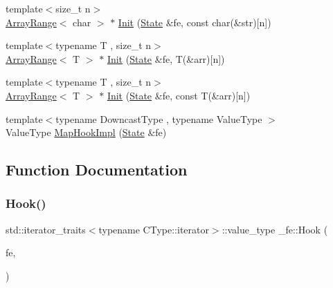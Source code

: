 \begin{DoxyCompactItemize}
\item 
{\footnotesize template$<$size\+\_\+t n$>$ }\\\mbox{\hyperlink{struct__fe_1_1ArrayRange}{Array\+Range}}$<$ char $>$ $\ast$ \mbox{\hyperlink{namespace__fe_ac8a11e0ea804066967b5e731edd79876}{Init}} (\mbox{\hyperlink{struct__fe_1_1State}{State}} \&fe, const char(\&str)\mbox{[}n\mbox{]})
\item 
{\footnotesize template$<$typename T , size\+\_\+t n$>$ }\\\mbox{\hyperlink{struct__fe_1_1ArrayRange}{Array\+Range}}$<$ T $>$ $\ast$ \mbox{\hyperlink{namespace__fe_a0de0f309238a8bd2fd46faec6164f1e7}{Init}} (\mbox{\hyperlink{struct__fe_1_1State}{State}} \&fe, T(\&arr)\mbox{[}n\mbox{]})
\item 
{\footnotesize template$<$typename T , size\+\_\+t n$>$ }\\\mbox{\hyperlink{struct__fe_1_1ArrayRange}{Array\+Range}}$<$ T $>$ $\ast$ \mbox{\hyperlink{namespace__fe_ae66d437a50aae83e14008aa3dc16cd3c}{Init}} (\mbox{\hyperlink{struct__fe_1_1State}{State}} \&fe, const T(\&arr)\mbox{[}n\mbox{]})
\item 
{\footnotesize template$<$typename Downcast\+Type , typename Value\+Type $>$ }\\Value\+Type \mbox{\hyperlink{namespace__fe_ae9577cf6364fac037b3be1e07193940c}{Map\+Hook\+Impl}} (\mbox{\hyperlink{struct__fe_1_1State}{State}} \&fe)
\end{DoxyCompactItemize}


\subsection{Function Documentation}
\mbox{\label{namespace__fe_a8cbabb96de19ff26050daf1352fe6699}} 
\subsubsection{\texorpdfstring{Hook()}{Hook()}\hspace{0.1cm}{\footnotesize\ttfamily [1/3]}}
{\footnotesize\ttfamily std\+::iterator\+\_\+traits$<$typename C\+Type\+::iterator$>$\+::value\+\_\+type \+\_\+fe\+::\+Hook (\begin{DoxyParamCaption}\item[{\mbox{\hyperlink{struct__fe_1_1State}{State}} \&}]{fe,  }\item[{\mbox{\hyperlink{struct__fe_1_1CRange}{C\+Range}}$<$ C\+Type $>$ $\ast$}]{ }\end{DoxyParamCaption})}

